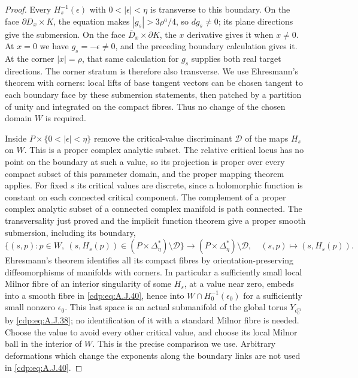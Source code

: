 \begin{proof}
Every $H_s^{-1}(\epsilon)$ with
$0<|\epsilon|<\eta$ is transverse to this boundary.
On the face $\partial D_x\times K$, the equation
makes $|g_s|>3\rho^a/4$, so $dg_s\ne0$; its plane
directions give the submersion. On the face
$\overline D_x\times\partial K$, the $x$
derivative gives it when $x\ne0$. At $x=0$ we
have $g_s=-\epsilon\ne0$, and the preceding
boundary calculation gives it. At the corner
$|x|=\rho$, that same calculation for $g_s$
supplies both real target directions. The corner
stratum is therefore also transverse. We use
Ehresmann's theorem with corners: local lifts of
base tangent vectors can be chosen tangent to
each boundary face by these submersion statements,
then patched by a partition of unity and
integrated on the compact fibres. Thus no change
of the chosen domain $W$ is required.

Inside $P\times\{0<|\epsilon|<\eta\}$ remove the
critical-value discriminant $\mathcal D$ of the
maps $H_s$ on $W$. This is a proper complex
analytic subset. The relative critical locus has
no point on the boundary at such a value, so its
projection is proper over every compact subset
of this parameter domain, and the proper mapping
theorem applies. For fixed $s$ its critical
values are discrete, since a holomorphic function
is constant on each connected critical component.
The complement of a proper complex analytic
subset of a connected complex manifold is path
connected. The transversality just proved and
the implicit function theorem give a proper
smooth submersion, including its boundary,
\[
 \{(s,p):p\in W,\ (s,H_s(p))\in
                    (P\times\Delta_\eta^*)\setminus\mathcal D\}
 \longrightarrow
       (P\times\Delta_\eta^*)\setminus\mathcal D,
 \quad (s,p)\longmapsto(s,H_s(p)).                 \tag{A.J.40}\label{cdp:eq:A.J.40}
\]
Ehresmann's theorem identifies all its compact
fibres by orientation-preserving diffeomorphisms
of manifolds with corners.
In particular a sufficiently small local Milnor
fibre of an interior singularity of some $H_s$,
at a value near zero, embeds into a smooth fibre
in \eqref{cdp:eq:A.J.40}, hence into
$W\cap H_0^{-1}(\epsilon_0)$ for a sufficiently
small nonzero $\epsilon_0$. This last space is
an actual submanifold of the global torus
$Y_{\epsilon_0^m}$ by \eqref{cdp:eq:A.J.38}; no identification
of it with a standard Milnor fibre is needed.
Choose the value to avoid every other
critical value, and choose its local Milnor ball
in the interior of $W$. This is the precise
comparison we use. Arbitrary deformations which
change the exponents along the boundary links
are not used in \eqref{cdp:eq:A.J.40}.


\end{proof}
